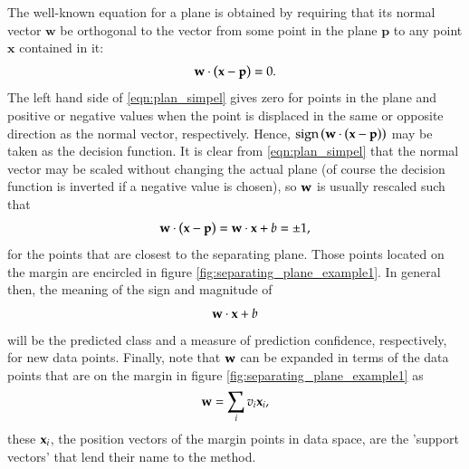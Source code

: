 The well-known equation for a plane is obtained by requiring that its normal vector $\mathbf{w}$ be orthogonal to the vector from some point in the plane $\mathbf{p}$ to any point $\mathbf{x}$ contained in it:
\begin{equation}
	\mathbf{w}\cdot\left( \mathbf{x} - \mathbf{p} \right) = 0. \label{eqn:plan_simpel}
\end{equation}
The left hand side of \eqref{eqn:plan_simpel} gives zero for points in the plane and positive or negative values when the point is displaced in the same or opposite direction as the normal vector, respectively. Hence,  $\text{sign}\left( \mathbf{w}\cdot\left( \mathbf{x} - \mathbf{p} \right) \right)$ may be taken as the decision function. It is clear from \eqref{eqn:plan_simpel} that the normal vector may be scaled without changing the actual plane (of course the decision function is inverted if a negative value is chosen), so $\mathbf{w}$ is usually rescaled such that
\begin{equation}
	\mathbf{w}\cdot\left( \mathbf{x} - \mathbf{p} \right) = \mathbf{w}\cdot \mathbf{x} + b = \pm 1, \label{eqn:rescaled_normal_vector}
\end{equation}
for the points that are closest to the separating plane. Those points located on the margin are encircled in figure \ref{fig:separating_plane_example1}. In general then, the meaning of the sign and magnitude of
\begin{equation}
	\mathbf{w}\cdot \mathbf{x} + b
\end{equation}
will be the predicted class and a measure of prediction confidence, respectively, for new data points. Finally, note that $\mathbf{w}$ can be expanded in terms of the data points that are on the margin in figure \ref{fig:separating_plane_example1} as
\begin{equation}
	\mathbf{w} = \sum_i v_i \mathbf{x}_i,
\end{equation}
these $\mathbf{x}_i$, the position vectors of the margin points in data space, are the 'support vectors' that lend their name to the method.

